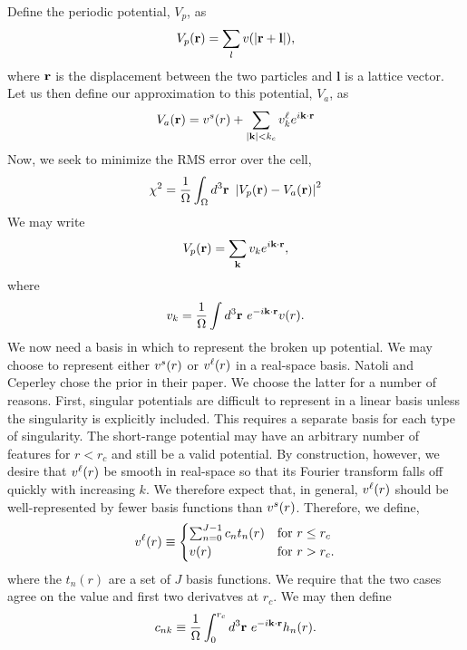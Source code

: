 \documentclass{article}
\begin{document}
Define the periodic potential, $V_p$, as 
\begin{equation}
V_p(\mathbf{r}) = \sum_l v(|\mathbf{r} + \mathbf{l}|),
\end{equation}
where $\mathbf{r}$ is the displacement between the two particles and
$\mathbf{l}$ is a lattice vector.  Let us then define our
approximation to this potential, $V_a$, as
\begin{equation}
V_a(\mathbf{r}) = v^s(r) + \sum_{|\mathbf{k}| < k_c} v^\ell_k e^{i\mathbf {\mathbf{k}} \cdot \mathbf{r}}
\end{equation}
Now, we seek to minimize the RMS error over the cell,
\begin{equation}
\chi^2 = \frac{1}{\Omega}\int_\Omega d^3 \mathbf{r} \ 
\left| V_p(\vr) - V_a(\vr)\right|^2 
\end{equation}
We may write
\begin{equation}
V_p(\mathbf{r}) = \sum_{\mathbf{k}} v_k e^{i \mathbf{k} \cdot \mathbf{r}},
\end{equation}
where 
\begin{equation}
v_k = \frac{1}{\Omega} \int d^3\mathbf{r} \ e^{-i\mathbf{k}\cdot\mathbf{r}}v(r).
\end{equation}
We now need a basis in which to represent the broken up potential.  We
may choose to represent either $v^s(r)$ or $v^\ell(r)$ in a real-space
basis.  Natoli and Ceperley chose the prior in their paper.  We choose
the latter for a number of reasons.  First, singular potentials are
difficult to represent in a linear basis unless the singularity is
explicitly included.  This requires a separate basis for each type of
singularity.  The short-range potential may have an arbitrary number
of features for $r<r_c$ and still be a valid potential.  By
construction, however, we desire that $v^\ell(r)$ be smooth in real-space
so that its Fourier transform falls off quickly with increasing $k$.
We therefore expect that, in general, $v^\ell(r)$ should be
well-represented by fewer basis functions than $v^s(r)$.  Therefore,
we define,
\begin{equation}
v^\ell(r) \equiv
\begin{cases}
 \sum_{n=0}^{J-1} c_n t_n(r) & \text{for } r \le r_c \\
 v(r) & \text{for } r > r_c.
\end{cases}
\end{equation}
where the $t_n(r)$ are a set of $J$ basis functions.  We require that
the two cases agree on the value and first two derivatves at $r_c$.
We may then define
\begin{equation}
c_{nk} \equiv \frac{1}{\Omega} \int_0^{r_c} d^3 \mathbf{r} \ e^{-i\mathbf{k}\cdot\mathbf{r}} h_n(r).
\end{equation}
\end{document}

